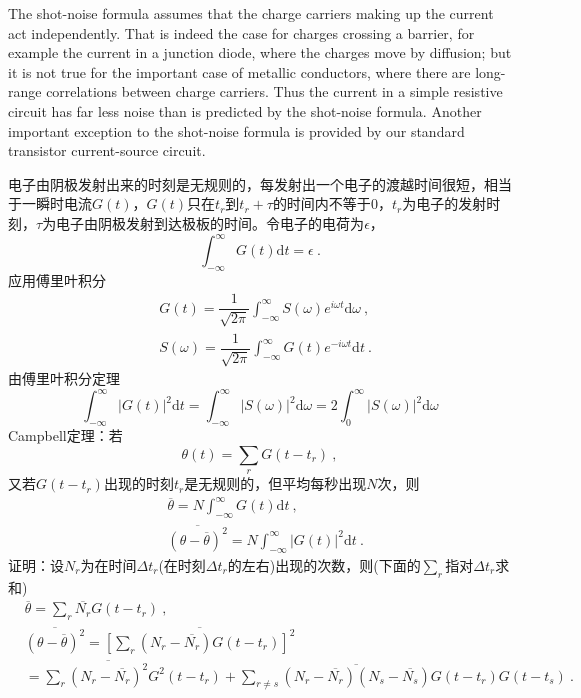 \documentclass[11pt,a4paper]{article}
\newcommand{\dif}{\mathrm{d}}
\begin{document}
The shot-noise formula assumes that the charge carriers making up the current act independently. That is indeed the case for charges crossing a barrier, for example the current in a junction diode, where the charges move by diffusion; but it is not true for the important case of metallic conductors, where there are long-range correlations between charge carriers. Thus the current in a simple resistive circuit has far less noise than is predicted by the shot-noise formula. Another important exception to the shot-noise formula is provided by our standard transistor current-source circuit.

\cite{wangzhuxi1965} 电子由阴极发射出来的时刻是无规则的，每发射出一个电子的渡越时间很短，相当于一瞬时电流$G(t)$，$G(t)$只在$t_r$到$t_r +\tau$的时间内不等于$0$，$t_r$为电子的发射时刻，$\tau$为电子由阴极发射到达极板的时间。令电子的电荷为$\epsilon$，
\begin{equation}
\int_{-\infty}^\infty G(t) \dif t = \epsilon ~.
\end{equation}
应用傅里叶积分
\begin{align}
& G(t) = \dfrac{1}{\sqrt{2\pi}} \int_{-\infty}^\infty S(\omega) e^{i\omega t} \dif \omega ~, \\
& S(\omega) = \dfrac{1}{\sqrt{2\pi}} \int_{-\infty}^\infty G(t) e^{-i\omega t} \dif t ~.
\end{align}
由傅里叶积分定理
\begin{equation}
\int_{-\infty}^\infty |G(t)|^2 \dif t = \int_{-\infty}^\infty |S(\omega)|^2 \dif \omega = 2 \int_0^\infty |S(\omega)|^2 \dif \omega
\end{equation}
Campbell定理：若
\begin{equation*}
\theta(t) = \sum_r G(t-t_r) ~,
\end{equation*}
又若$G(t-t_r)$出现的时刻$t_r$是无规则的，但平均每秒出现$N$次，则
\begin{align}
& \overline{\theta} = N \int_{-\infty}^\infty G(t) \dif t ~, \\
& \overline{(\theta -\overline{\theta})^2} = N \int_{-\infty}^\infty |G(t)|^2 \dif t ~.
\end{align}
证明：设$N_r$为在时间$\Delta t_r$(在时刻$\Delta t_r$的左右)出现的次数，则(下面的$\sum_r$指对$\Delta t_r$求和)
\begin{align}
& \overline{\theta} = \sum_r \overline{N_r} G(t-t_r) ~, \\
& \overline{(\theta -\overline{\theta})^2} = \overline{\left[\sum_r (N_r -\overline{N_r}) G(t-t_r)\right]^2} \\
\nonumber &= \sum_r \overline{(N_r -\overline{N_r})^2} G^2(t-t_r) +\sum_{r \neq s}  \overline{(N_r -\overline{N_r})(N_s -\overline{N_s})} G(t-t_r)G(t-t_s) ~. 
\end{align}
\end{document}
